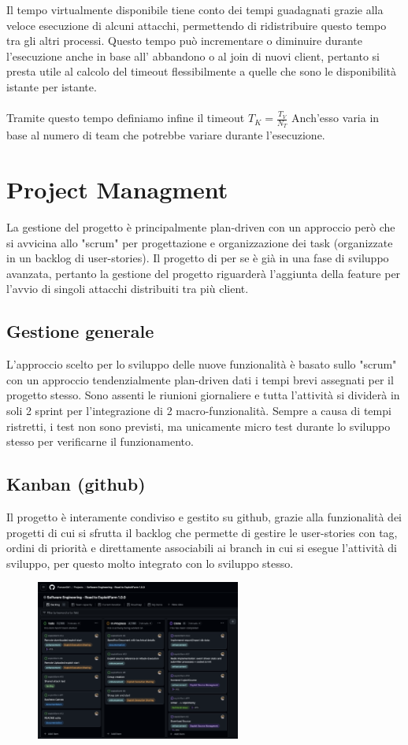 \documentclass[11pt]{article}
\begin{document}
Il tempo virtualmente disponibile tiene conto dei tempi guadagnati grazie alla veloce esecuzione di alcuni attacchi, permettendo di ridistribuire questo tempo tra gli altri processi. Questo tempo può incrementare o diminuire durante l'esecuzione anche in base all' abbandono o al join di nuovi client, pertanto si presta utile al calcolo del timeout flessibilmente a quelle che sono le disponibilità istante per istante.\\\\
Tramite questo tempo definiamo infine il timeout $T_K = \frac{T_V}{N_T}$
Anch'esso varia in base al numero di team che potrebbe variare durante l'esecuzione.

\section{Project Managment}
La gestione del progetto è principalmente plan-driven con un approccio però che si avvicina allo "scrum" per progettazione e organizzazione dei task (organizzate in un backlog di user-stories). Il progetto di per se è già in una fase di sviluppo avanzata, pertanto la gestione del progetto riguarderà l'aggiunta della feature per l'avvio di singoli attacchi distribuiti tra più client.
\subsection{Gestione generale}
L'approccio scelto per lo sviluppo delle nuove funzionalità è basato sullo "scrum" con un approccio tendenzialmente plan-driven dati i tempi brevi assegnati per il progetto stesso. Sono assenti le riunioni giornaliere e tutta l'attività si dividerà in soli 2 sprint per l'integrazione di 2 macro-funzionalità.
Sempre a causa di tempi ristretti, i test non sono previsti, ma unicamente micro test durante lo sviluppo stesso per verificarne il funzionamento.
\subsection{Kanban (github)}
Il progetto è interamente condiviso e gestito su github, grazie alla funzionalità dei progetti di cui si sfrutta il backlog che permette di gestire le user-stories con tag, ordini di priorità e direttamente associabili ai branch in cui si esegue l'attività di sviluppo, per questo molto integrato con lo sviluppo stesso.
	\begin{figure}[H]
    	\centering
    	\includegraphics[width=0.6\textwidth]{backlog.png}
	\end{figure}
\end{document}
